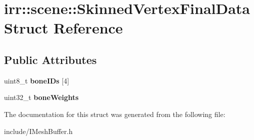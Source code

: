 \hypertarget{structirr_1_1scene_1_1SkinnedVertexFinalData}{}\section{irr\+:\+:scene\+:\+:Skinned\+Vertex\+Final\+Data Struct Reference}
\label{structirr_1_1scene_1_1SkinnedVertexFinalData}
\subsection*{Public Attributes}
\begin{DoxyCompactItemize}
\item 
uint8\+\_\+t {\bfseries bone\+I\+Ds} \mbox{[}4\mbox{]}\hypertarget{structirr_1_1scene_1_1SkinnedVertexFinalData_aa0fdc7b77ec1dfa3b8720a1699170454}{}\label{structirr_1_1scene_1_1SkinnedVertexFinalData_aa0fdc7b77ec1dfa3b8720a1699170454}

\item 
uint32\+\_\+t {\bfseries bone\+Weights}\hypertarget{structirr_1_1scene_1_1SkinnedVertexFinalData_ab4d03d20234c22c5c53bd819c2652b3a}{}\label{structirr_1_1scene_1_1SkinnedVertexFinalData_ab4d03d20234c22c5c53bd819c2652b3a}

\end{DoxyCompactItemize}


The documentation for this struct was generated from the following file\+:\begin{DoxyCompactItemize}
\item 
include/I\+Mesh\+Buffer.\+h\end{DoxyCompactItemize}
